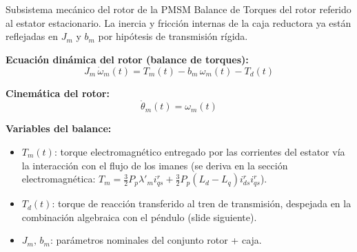 \documentclass[aspectratio=169,t]{beamer}
\begin{document}
\begin{frame}{Subsistema mecánico del rotor de la PMSM}
{\small\color{uncGray}Balance de Torques del rotor referido al estator estacionario. La inercia y fricción internas de la caja reductora ya están reflejadas en $J_m$ y $b_m$ por hipótesis de transmisión rígida.}\par
\vspace{4mm}

\textbf{Ecuación dinámica del rotor (balance de torques):}
\begin{equation*}
J_m\,\dot{\omega}_m(t) = T_m(t) - b_m\,\omega_m(t) - T_d(t)
\end{equation*}

\textbf{Cinemática del rotor:}
\begin{equation*}
\dot{\theta}_m(t) = \omega_m(t)
\end{equation*}

\textbf{Variables del balance:}
\begin{itemize}
\item $T_m(t)$: torque electromagnético entregado por las corrientes del estator vía la interacción con el flujo de los imanes (se deriva en la sección electromagnética: $T_m = \tfrac{3}{2}P_p\lambda'_m i_{qs}^r + \tfrac{3}{2}P_p(L_d-L_q)i_{ds}^r i_{qs}^r$).
\item $T_d(t)$: torque de reacción transferido al tren de transmisión, despejada en la combinación algebraica con el péndulo (slide siguiente).
\item $J_m,\,b_m$: parámetros nominales del conjunto rotor + caja.
\end{itemize}
\end{frame}
\end{document}
